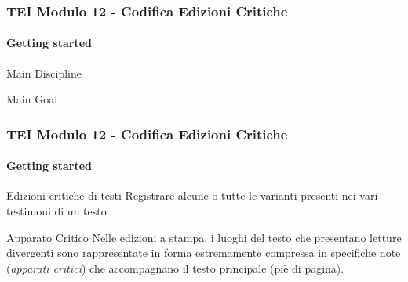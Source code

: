 





\begin{frame}
    \frametitle{TEI Modulo 12 - Codifica Edizioni Critiche}
    \framesubtitle{Getting started}
    \addtocounter{nframe}{1}
    
    \begin{block}{Main Discipline}
    \end{block}

    \begin{block}{Main Goal}
    \end{block}

\end{frame}

\begin{frame}
    \frametitle{TEI Modulo 12 - Codifica Edizioni Critiche}
    \framesubtitle{Getting started}
    \addtocounter{nframe}{1}





    \begin{block}{Edizioni critiche di testi}
        Registrare alcune o tutte le varianti presenti nei vari testimoni di un testo
    \end{block}

    \begin{block}{Apparato Critico}
       Nelle edizioni a stampa, i luoghi del testo che presentano letture divergenti sono rappresentate in forma estremamente compressa in specifiche note (\textit{apparati critici}) che accompagnano il testo principale (piè di pagina).
    \end{block}

\end{frame}

